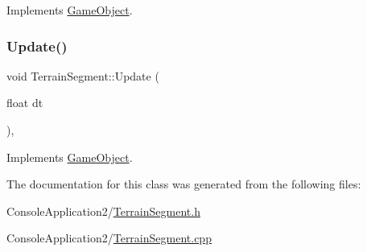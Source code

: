 Implements \hyperlink{class_game_object_a8a3c07e92775fe00baa9e661fefb224e}{Game\+Object}.

\hypertarget{class_terrain_segment_ac8a610b8011a973e775b0cf205ba473a}{}\label{class_terrain_segment_ac8a610b8011a973e775b0cf205ba473a} 
\subsubsection{\texorpdfstring{Update()}{Update()}}
{\footnotesize\ttfamily void Terrain\+Segment\+::\+Update (\begin{DoxyParamCaption}\item[{float}]{dt }\end{DoxyParamCaption})\hspace{0.3cm}{\ttfamily [override]}, {\ttfamily [virtual]}}



Implements \hyperlink{class_game_object_a93ed63df640deb516a020530e7f8e045}{Game\+Object}.



The documentation for this class was generated from the following files\+:\begin{DoxyCompactItemize}
\item 
Console\+Application2/\hyperlink{_terrain_segment_8h}{Terrain\+Segment.\+h}\item 
Console\+Application2/\hyperlink{_terrain_segment_8cpp}{Terrain\+Segment.\+cpp}\end{DoxyCompactItemize}
